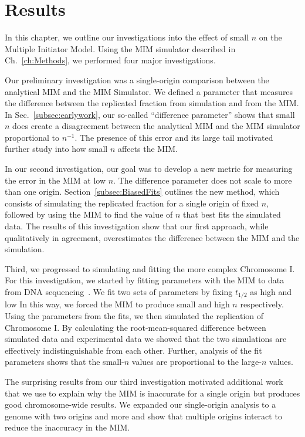\chapter{Results}
\label{ch:Results}

In this chapter, we outline our investigations into the effect of small $n$ on the Multiple Initiator Model.
Using the MIM simulator described in Ch.~\ref{ch:Methods}, we performed four major investigations.

Our preliminary investigation was a single-origin comparison between the analytical MIM and the MIM Simulator.
We defined a parameter that measures the difference between the replicated fraction from simulation and from the MIM.
In Sec.~\ref{subsec:earlywork}, our so-called ``difference parameter'' shows that small $n$ does create a disagreement between the analytical MIM and the MIM simulator proportional to $n^{-1}$.
The presence of this error and its large tail motivated further study into how small $n$ affects the MIM.

In our second investigation, our goal was to develop a new metric for measuring the error in the MIM at low $n$.
The difference parameter does not scale to more than one origin.
Section~\ref{subsec:BiasedFits} outlines the new method, which consists of simulating the replicated fraction for a single origin of fixed $n$, followed by using the MIM to find the value of $n$ that best fits the simulated data.
The results of this investigation show that our first approach, while qualitatively in agreement, overestimates the difference between the MIM and the simulation.

Third, we progressed to simulating and fitting the more complex Chromosome I.
For this investigation, we started by fitting parameters with the MIM to data from DNA sequencing~\cite{StochasticTermination}.
We fit two sets of parameters by fixing $t_{1/2}$ as high and low
In this way, we forced the MIM to produce small and high $n$ respectively.
Using the parameters from the fits, we then simulated the replication of Chromosome I.
By calculating the root-mean-squared difference between simulated data and experimental data we showed that the two simulations are effectively indistinguishable from each other.
Further, analysis of the fit parameters shows that the small-$n$ values are proportional to the large-$n$ values.

The surprising results from our third investigation motivated additional work that we use to explain why the MIM is inaccurate for a single origin but produces good chromosome-wide results.
We expanded our single-origin analysis to a genome with two origins and more and show that multiple origins interact to reduce the inaccuracy in the MIM.

